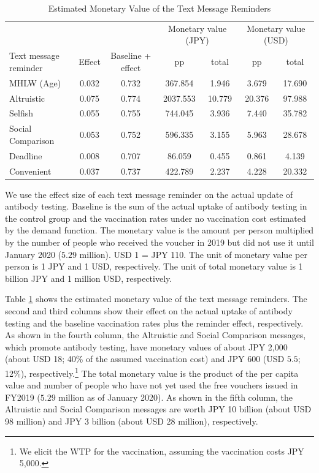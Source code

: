\documentclass[
  11pt,
  a4paper
]{article}
\begin{document}
\begin{table}

\caption{\label{tab:monetary-value}Estimated Monetary Value of the Text Message Reminders}
\centering
\fontsize{9}{11}\selectfont
\begin{threeparttable}
\begin{tabular}[t]{lcccccc}
\toprule
\multicolumn{3}{c}{ } & \multicolumn{2}{c}{Monetary value (JPY)} & \multicolumn{2}{c}{Monetary value (USD)} \\
\cmidrule(l{3pt}r{3pt}){4-5} \cmidrule(l{3pt}r{3pt}){6-7}
Text message reminder & Effect & Baseline + effect & pp & total & pp & total\\
\midrule
MHLW (Age) & 0.032 & 0.732 & 367.854 & 1.946 & 3.679 & 17.690\\
Altruistic & 0.075 & 0.774 & 2037.553 & 10.779 & 20.376 & 97.988\\
Selfish & 0.055 & 0.755 & 744.045 & 3.936 & 7.440 & 35.782\\
Social Comparison & 0.053 & 0.752 & 596.335 & 3.155 & 5.963 & 28.678\\
Deadline & 0.008 & 0.707 & 86.059 & 0.455 & 0.861 & 4.139\\
Convenient & 0.037 & 0.737 & 422.789 & 2.237 & 4.228 & 20.332\\
\bottomrule
\end{tabular}
\begin{tablenotes}
\item We use the effect size of each text message reminder on the actual update of antibody testing. Baseline is the sum of the actual uptake of antibody testing in the control group and the vaccination rates under no vaccination cost estimated by the demand function. The monetary value is the amount per person multiplied by the number of people who received the voucher in 2019 but did not use it until January 2020 ($5.29$ million). USD 1 = JPY 110. The unit of monetary value per person is 1 JPY and 1 USD, respectively. The unit of total monetary value is 1 billion JPY and 1 million USD, respectively.
\end{tablenotes}
\end{threeparttable}
\end{table}

Table \ref{tab:monetary-value} shows the estimated monetary value of the text message reminders. The second and third columns show their effect on the actual uptake of antibody testing and the baseline vaccination rates plus the reminder effect, respectively. As shown in the fourth column, the Altruistic and Social Comparison messages, which promote antibody testing, have monetary values of about JPY 2,000 (about USD 18; 40\% of the assumed vaccination cost) and JPY 600 (USD \(5.5\); 12\%), respectively.\footnote{We elicit the WTP for the vaccination, assuming the vaccination costs JPY 5,000.} The total monetary value is the product of the per capita value and number of people who have not yet used the free vouchers issued in FY2019 (\(5.29\) million as of January 2020). As shown in the fifth column, the Altruistic and Social Comparison messages are worth JPY 10 billion (about USD 98 million) and JPY 3 billion (about USD 28 million), respectively.
\end{document}
